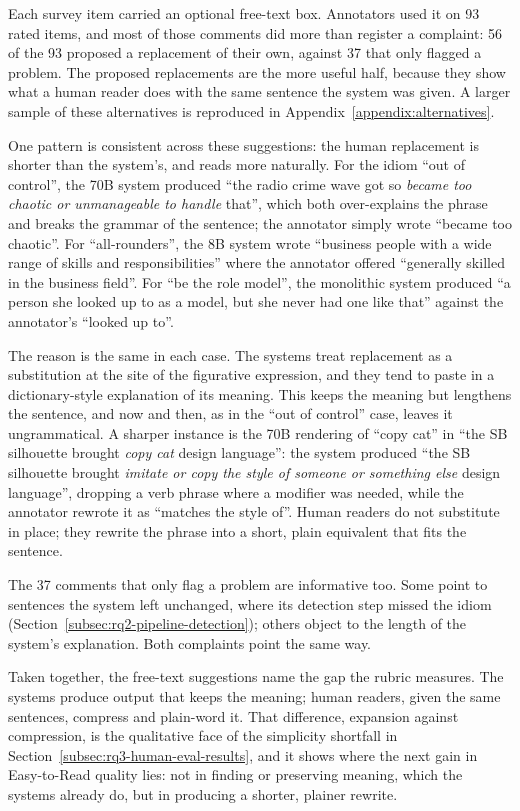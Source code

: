 Each survey item carried an optional free-text box. Annotators used it on 93 rated items, and most of those comments did more than register a complaint: 56 of the 93 proposed a replacement of their own, against 37 that only flagged a problem. The proposed replacements are the more useful half, because they show what a human reader does with the same sentence the system was given. A larger sample of these alternatives is reproduced in Appendix~\ref{appendix:alternatives}.

One pattern is consistent across these suggestions: the human replacement is shorter than the system's, and reads more naturally. For the idiom ``out of control'', the 70B system produced ``the radio crime wave got so \textit{became too chaotic or unmanageable to handle} that'', which both over-explains the phrase and breaks the grammar of the sentence; the annotator simply wrote ``became too chaotic''. For ``all-rounders'', the 8B system wrote ``business people with a wide range of skills and responsibilities'' where the annotator offered ``generally skilled in the business field''. For ``be the role model'', the monolithic system produced ``a person she looked up to as a model, but she never had one like that'' against the annotator's ``looked up to''.

The reason is the same in each case. The systems treat replacement as a substitution at the site of the figurative expression, and they tend to paste in a dictionary-style explanation of its meaning. This keeps the meaning but lengthens the sentence, and now and then, as in the ``out of control'' case, leaves it ungrammatical. A sharper instance is the 70B rendering of ``copy cat'' in ``the SB silhouette brought \textit{copy cat} design language'': the system produced ``the SB silhouette brought \textit{imitate or copy the style of someone or something else} design language'', dropping a verb phrase where a modifier was needed, while the annotator rewrote it as ``matches the style of''. Human readers do not substitute in place; they rewrite the phrase into a short, plain equivalent that fits the sentence.

The 37 comments that only flag a problem are informative too. Some point to sentences the system left unchanged, where its detection step missed the idiom (Section~\ref{subsec:rq2-pipeline-detection}); others object to the length of the system's explanation. Both complaints point the same way.

Taken together, the free-text suggestions name the gap the rubric measures. The systems produce output that keeps the meaning; human readers, given the same sentences, compress and plain-word it. That difference, expansion against compression, is the qualitative face of the simplicity shortfall in Section~\ref{subsec:rq3-human-eval-results}, and it shows where the next gain in Easy-to-Read quality lies: not in finding or preserving meaning, which the systems already do, but in producing a shorter, plainer rewrite.
